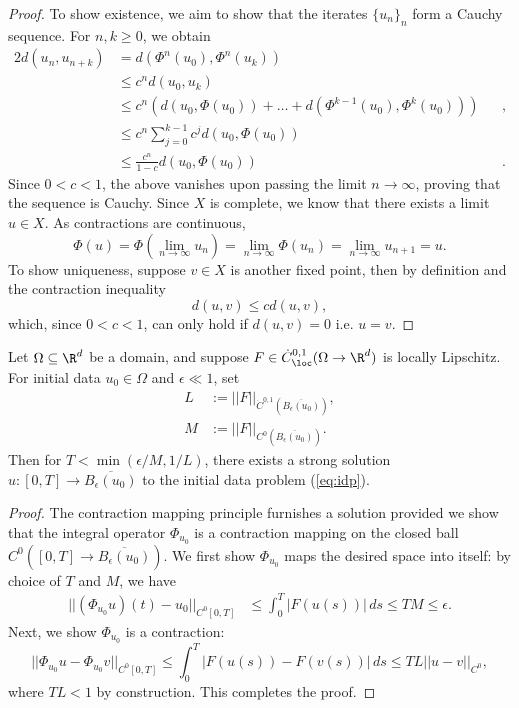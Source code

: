 \begin{proof}
	To show existence, we aim to show that the iterates $\{u_n\}_n$ form a Cauchy sequence. For $n, k \geq 0$, we obtain
		\begin{alignat*}{2}
			 d(u_n, u_{n + k}) 
			 	&= d(\Phi^n (u_0), \Phi^n (u_k))			
			 		&&\\
			 	&\leq c^n d(u_0, u_k) 
			 		&&\\
			 	&\leq c^n \left( d(u_0, \Phi(u_0)) + \dots + d(\Phi^{k - 1} (u_0), \Phi^k (u_0)) \right) 
			 		&&, \\
			 	&\leq 	c^n \sum_{j = 0}^{k - 1} c^j d(u_0, \Phi(u_0))
			 		&& \\
			 	&\leq \frac{c^n}{1 - c} d(u_0, \Phi(u_0))
			 		&&.	
		\end{alignat*}	 
	Since $0 < c < 1$, the above vanishes upon passing the limit $n \to \infty$, proving that the sequence is Cauchy. Since $X$ is complete, we know that there exists a limit $u \in X$. As contractions are continuous, 
		\[ \Phi(u) = \Phi( \lim_{n \to \infty} u_n) = \lim_{n \to \infty} \Phi(u_n) = \lim_{n \to \infty} u_{n + 1} = u.  \]
	To show uniqueness, suppose $v \in X$ is another fixed point, then by definition and the contraction inequality
		\[ d(u, v) \leq cd(u, v), \]	
	which, since $0 < c < 1$, can only hold if $d(u, v) = 0$ i.e. $u = v$. 
\end{proof}

\begin{theorem}
	Let $\Omega \subseteq \R^d$ be a domain, and suppose $F \in \dot C^{0, 1}_{\loc} (\Omega \to \R^d)$ is locally Lipschitz. For initial data $u_0 \in \Omega$ and $\epsilon \ll 1$, set
		\begin{align*}
			L
				&:= ||F||_{\dot C^{0, 1} (\overline{B_\epsilon (u_0)})} ,\\
			M
				&:= ||F||_{C^{0} (\overline{B_\epsilon (u_0)})}.	
		\end{align*}
	Then for $T < \min (\epsilon/M, 1/L)$, there exists a strong solution $u: [0, T] \to \overline{B_\epsilon (u_0)}$ to the initial data problem (\ref{eq:idp}). 
\end{theorem}

\begin{proof}
	The contraction mapping principle furnishes a solution provided we show that the integral operator $\Phi_{u_0}$ is a contraction mapping on the closed ball $C^0 ([0, T] \to \overline{B_\epsilon (u_0)})$. We first show $\Phi_{u_0}$ maps the desired space into itself: by choice of $T$ and $M$, we have 
		\begin{align*}
			 ||(\Phi_{u_0} u)(t) - u_0||_{C^0 [0, T]} 
			 	&\leq \int_0^T |F(u(s))| \, ds \leq TM \leq \epsilon. 
		\end{align*}
	Next, we show $\Phi_{u_0}$ is a contraction: 
		\[ ||\Phi_{u_0} u - \Phi_{u_0} v||_{C^0 [0, T]} \leq  \int_0^T |F(u(s)) - F(v(s))| \, ds \leq T L ||u - v||_{C^0}, \]
	where $TL < 1$ by construction. This completes the proof.
\end{proof}

